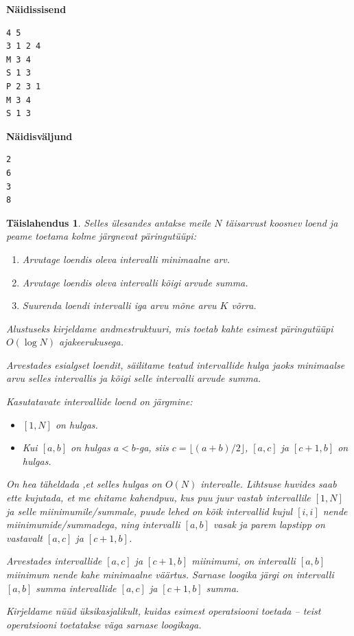 \documentclass{trkut}
\newtheorem*{solution}{Täislahendus}
\begin{document}
\textbf{Näidissisend}

\begin{verbatim}
4 5
3 1 2 4
M 3 4
S 1 3
P 2 3 1
M 3 4
S 1 3
\end{verbatim}

\textbf{Näidisväljund}

\begin{verbatim}
2
6
3
8
\end{verbatim}


\begin{solution}
Selles ülesandes antakse meile $N$ täisarvust koosnev loend ja peame toetama kolme järgnevat päringutüüpi:

\begin{enumerate}
    \item Arvutage loendis oleva intervalli minimaalne arv.
    \item Arvutage loendis oleva intervalli kõigi arvude summa.
    \item Suurenda loendi intervalli iga arvu mõne arvu $K$ võrra.
\end{enumerate}

Alustuseks kirjeldame andmestruktuuri, mis toetab kahte esimest päringutüüpi $O(\log N)$ ajakeerukusega.

Arvestades esialgset loendit, säilitame teatud intervallide hulga jaoks minimaalse arvu selles intervallis ja kõigi selle intervalli arvude summa. 

Kasutatavate intervallide loend on järgmine:
\begin{itemize}
    \item $[1,N]$ on hulgas.
    \item Kui $[a,b]$ on hulgas $a<b$-ga, siis $c=⌊{(a+b)}/2⌋$, $[a,c]$ ja $[c+1,b]$ on hulgas.
\end{itemize}


On hea täheldada ,et selles hulgas on $O(N)$ intervalle. 
Lihtsuse huvides saab ette kujutada, et me ehitame kahendpuu, kus puu juur vastab intervallile $[1,N]$ ja selle miinimumile/summale, puude lehed on kõik intervallid kujul $[i,i]$ nende miinimumide/summadega, ning intervalli $[a,b]$ vasak ja parem lapstipp on vastavalt $[a,c]$ ja $[c+1,b]$.

Arvestades intervallide $[a,c]$ ja $[c+1,b]$ miinimumi, on intervalli $[a,b]$ miinimum nende kahe minimaalne väärtus. Sarnase loogika järgi on intervalli $[a,b]$ summa intervallide $[a,c]$ ja $[c+1,b]$ summa.

Kirjeldame nüüd üksikasjalikult, kuidas esimest operatsiooni toetada – teist operatsiooni toetatakse väga sarnase loogikaga.


\end{solution}
\end{document}
